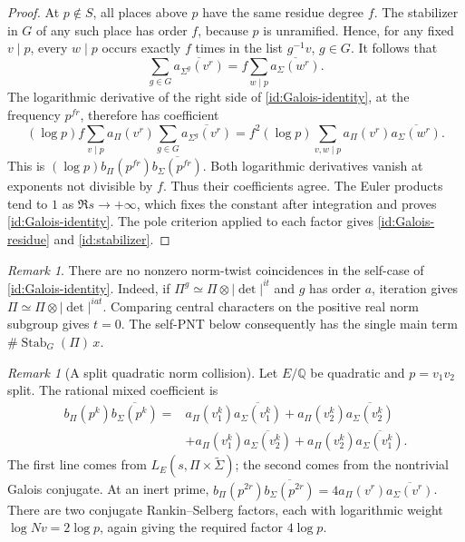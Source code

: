\documentclass[11pt,reqno]{amsart}
\numberwithin{equation}{section}
\theoremstyle{definition}
\theoremstyle{remark}
\newtheorem{remark}[theorem]{Remark}
\newcommand{\Q}{\mathbb Q}
\begin{document}
\begin{proof}
At $p\notin S$, all places above $p$ have the same residue degree $f$.
The stabilizer in $G$ of any such place has order $f$, because $p$ is
unramified. Hence, for any fixed $v\mid p$, every $w\mid p$ occurs exactly
$f$ times in the list $g^{-1}v$, $g\in G$. It follows that
\[
 \sum_{g\in G}\overline{a_{\Sigma^g}(v^r)}
 =f\sum_{w\mid p}\overline{a_\Sigma(w^r)}.
\]
The logarithmic derivative of the right side of
\eqref{id:Galois-identity}, at the frequency $p^{fr}$, therefore has
coefficient
\[
 (\log p)f\sum_{v\mid p}a_\Pi(v^r)
       \sum_{g\in G}\overline{a_{\Sigma^g}(v^r)}
 =f^2(\log p)
   \sum_{v,w\mid p}a_\Pi(v^r)\overline{a_\Sigma(w^r)}.
\]
This is $(\log p)b_\Pi(p^{fr})\overline{b_\Sigma(p^{fr})}$.
Both logarithmic derivatives vanish at exponents not divisible by $f$.
Thus their coefficients agree. The Euler products tend to $1$ as
$\Re s\to+\infty$, which fixes the constant after integration and proves
\eqref{id:Galois-identity}. The pole criterion applied to each factor
gives \eqref{id:Galois-residue} and \eqref{id:stabilizer}.
\end{proof}

\begin{remark}\label{id:Galois-self-shifts}
There are no nonzero norm-twist coincidences in the self-case of
\eqref{id:Galois-identity}. Indeed, if
$\Pi^g\simeq\Pi\otimes|\det|^{it}$ and $g$ has order $a$, iteration gives
$\Pi\simeq\Pi\otimes|\det|^{iat}$. Comparing central characters on the
positive real norm subgroup gives $t=0$. The self-PNT below consequently
has the single main term
$\#\operatorname{Stab}_G(\Pi)\,x$.
\end{remark}

\begin{remark}[A split quadratic norm collision]\label{id:split-collision}
Let $E/\Q$ be quadratic and $p=v_1v_2$ split. The rational mixed
coefficient is
\begin{align*}
 b_\Pi(p^k)\overline{b_\Sigma(p^k)}
 ={}&a_\Pi(v_1^k)\overline{a_\Sigma(v_1^k)}
    +a_\Pi(v_2^k)\overline{a_\Sigma(v_2^k)}\\
 &+a_\Pi(v_1^k)\overline{a_\Sigma(v_2^k)}
    +a_\Pi(v_2^k)\overline{a_\Sigma(v_1^k)}.
\end{align*}
The first line comes from $L_E(s,\Pi\times\widetilde\Sigma)$; the second
comes from the nontrivial Galois conjugate. At an inert prime,
$b_\Pi(p^{2r})\overline{b_\Sigma(p^{2r})}
=4a_\Pi(v^r)\overline{a_\Sigma(v^r)}$.
There are two conjugate Rankin--Selberg factors, each with logarithmic
weight $\log Nv=2\log p$, again giving the required factor $4\log p$.
\end{remark}
\end{document}
